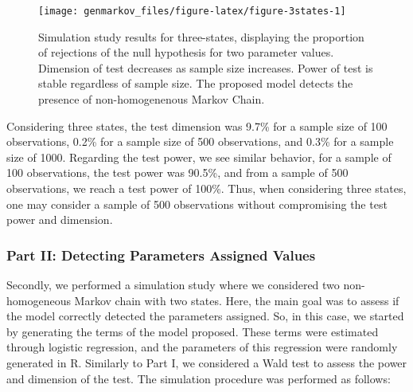 \begin{figure}

{\centering \texttt{[image: genmarkov\_files/figure-latex/figure-3states-1]} 

}

\caption{Simulation study results for three-states, displaying the proportion of rejections of the null hypothesis for two parameter values. Dimension of test decreases as sample size increases. Power of test is stable regardless of sample size. The proposed model detects the presence of non-homogenenous Markov Chain.}\label{fig:figure-3states}
\end{figure}

Considering three states, the test dimension was 9.7\% for a sample size of 100 observations, 0.2\% for a sample size of 500 observations, and 0.3\% for a sample size of 1000. Regarding the test power, we see similar behavior, for a sample of 100 observations, the test power was 90.5\%, and from a sample of 500 observations, we reach a test power of 100\%. Thus, when considering three states, one may consider a sample of 500 observations without compromising the test power and dimension.

\newpage

\hypertarget{part-ii-detecting-parameters-assigned-values}{%
\subsubsection{Part II: Detecting Parameters Assigned Values}\label{part-ii-detecting-parameters-assigned-values}}

Secondly, we performed a simulation study where we considered two non-homogeneous Markov chain with two states. Here, the main goal was to assess if the model correctly detected the parameters assigned. So, in this case, we started by generating the terms of the model proposed. These terms were estimated through logistic regression, and the parameters of this regression were randomly generated in R. Similarly to Part I, we considered a Wald test to assess the power and dimension of the test. The simulation procedure was performed as follows:

